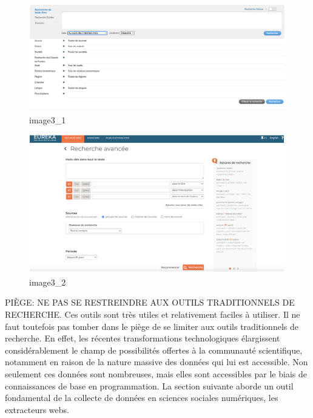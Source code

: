 \documentclass[
  letterpaper,
  DIV=11,
  numbers=noendperiod]{scrreprt}
\begin{document}
\begin{figure}[H]

{\centering \includegraphics{images/chapitre3_factiva.png}

}

\caption{image3\_1}

\end{figure}%
\begin{figure}[H]

{\centering \includegraphics{images/chapitre3_eureka.png}

}

\caption{image3\_2}

\end{figure}%

PIÈGE: NE PAS SE RESTREINDRE AUX OUTILS TRADITIONNELS DE RECHERCHE. Ces
outils sont très utiles et relativement faciles à utiliser. Il ne faut
toutefois pas tomber dans le piège de se limiter aux outils
traditionnels de recherche. En effet, les récentes transformations
technologiques élargissent considérablement le champ de possibilités
offertes à la communauté scientifique, notamment en raison de la nature
massive des données qui lui est accessible. Non seulement ces données
sont nombreuses, mais elles sont accessibles par le biais de
connaissances de base en programmation. La section suivante aborde un
outil fondamental de la collecte de données en sciences sociales
numériques, les extracteurs webs.
\end{document}
